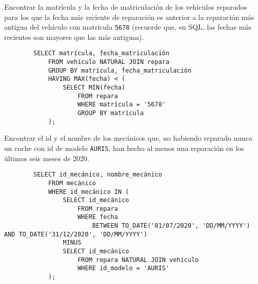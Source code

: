 \documentclass[12pt]{article}
\begin{document}
\begin{ejercicio}[SQL]
    Encontrar la matrícula y la fecha de matriculación de los vehículos reparados para los que la fecha más reciente de reparación es anterior a la reparación más antigua del vehículo con matrícula \verb|5678| (recuerde que, en SQL, las fechas más recientes son mayores que las más antiguas).
    \begin{verbatim}
        SELECT matrícula, fecha_matriculación
            FROM vehículo NATURAL JOIN repara
            GROUP BY matrícula, fecha_matriculación
            HAVING MAX(fecha) < (
                SELECT MIN(fecha)
                    FROM repara
                    WHERE matrícula = '5678'
                    GROUP BY matrícula
            );
    \end{verbatim}
\end{ejercicio}

\begin{ejercicio}[SQL]
    Encontrar el id y el nombre de los mecánicos que, no habiendo reparado nunca un coche con id de modelo \verb|AURIS|, han hecho al menos una reparación en los últimos seis meses de 2020.
    \begin{verbatim}
        SELECT id_mecánico, nombre_mecánico
            FROM mecánico
            WHERE id_mecánico IN (
                SELECT id_mecánico
                    FROM repara
                    WHERE fecha
                        BETWEEN TO_DATE('01/07/2020', 'DD/MM/YYYY') AND TO_DATE('31/12/2020', 'DD/MM/YYYY')
                MINUS
                SELECT id_mecánico
                    FROM repara NATURAL JOIN vehículo
                    WHERE id_modelo = 'AURIS'
            );
    \end{verbatim}
\end{ejercicio}
\end{document}
